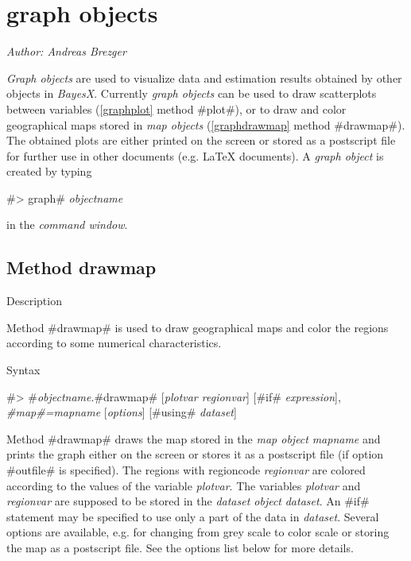 \chapter{graph objects}
\label{graphobj}  

{\em Author: Andreas Brezger} \\
\vspace{0.3cm}


{\em Graph objects} are used to visualize data and estimation
results obtained by other objects in {\em BayesX}. Currently {\em
graph objects} can be used to draw scatterplots between variables
(\autoref{graphplot} method #plot#), or to draw and color
geographical maps stored in {\em map objects}
(\autoref{graphdrawmap} method #drawmap#). The obtained plots are
either printed on the screen or stored as a postscript file for
further use in other documents (e.g. \LaTeX\/ documents).
A {\em graph object} is created by typing

#> graph# {\em objectname}

in the {\em command window}.



\clearpage



\section{Method drawmap}
\label{graphdrawmap} 

\begin{stanza}{Description}

{Method #drawmap# is used to draw geographical maps and color the
regions according to some numerical characteristics.}
\end{stanza}

\begin{stanza}{Syntax}

 #> #{\em objectname}.#drawmap#  [{\em plotvar regionvar}] [#if# {\em expression}], {\em #map#=mapname} [{\em options}]
 [#using# {\em dataset}]

Method #drawmap# draws the map stored in the {\em map object} {\em
mapname} and prints the graph either on the screen or stores it as
a postscript file (if option #outfile# is specified). The regions
with regioncode {\em regionvar} are colored according to the
values of the variable {\em plotvar}. The variables {\em plotvar}
and {\em regionvar} are supposed to be stored in the {\em dataset
object} {\em dataset}. An #if# statement may be specified to use
only a part of the data in {\em dataset}. Several options are
available, e.g. for changing from grey scale to color scale or
storing the map as a postscript file. See the options list below
for more details.
\end{stanza}

